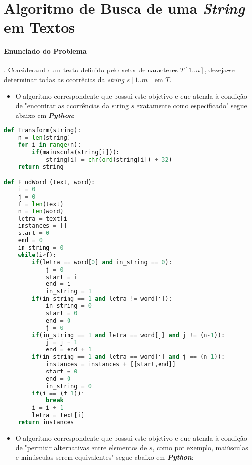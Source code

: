 \documentclass[paper=a4, fontsize=11pt]{scrartcl} %
\numberwithin{equation}{section} %
\numberwithin{figure}{section} %
\numberwithin{table}{section} %
\begin{document}
\pagebreak


\section{Algoritmo de Busca de uma \emph{String} em Textos}

\paragraph{Enunciado do Problema}: Considerando um texto definido pelo vetor de caracteres $T[1..n]$, deseja-se determinar todas as ocorrêcias da \emph{string} $s[1..m]$ em $T$. 

\begin{itemize}
   \item O algoritmo correspondente que possui este objetivo e que atenda à condição de "encontrar as ocorrências da string $s$ exatamente como especificado" segue abaixo em \emph{\textbf{Python}}:
\end{itemize}

\begin{lstlisting}[language=Python, caption=String Python Algorithm]
def Transform(string):
    n = len(string)
    for i in range(n):
        if(maiuscula(string[i])):
            string[i] = chr(ord(string[i]) + 32)
    return string

def FindWord (text, word):
    i = 0
    j = 0
    f = len(text)
    n = len(word)
    letra = text[i]
    instances = []
    start = 0
    end = 0
    in_string = 0
    while(i<f):
        if(letra == word[0] and in_string == 0):
            j = 0
            start = i
            end = i
            in_string = 1
        if(in_string == 1 and letra != word[j]):
            in_string = 0
            start = 0
            end = 0
            j = 0            
        if(in_string == 1 and letra == word[j] and j != (n-1)):
            j = j + 1
            end = end + 1   
        if(in_string == 1 and letra == word[j] and j == (n-1)):
            instances = instances + [[start,end]]
            start = 0
            end = 0
            in_string = 0
        if(i == (f-1)):
            break
        i = i + 1
        letra = text[i]
    return instances
\end{lstlisting}

\begin{itemize}
   \item O algoritmo correspondente que possui este objetivo e que atenda à condição de "permitir alternativas entre elementos de $s$, como por exemplo, maiúsculas e minúsculas serem equivalentes" segue abaixo em \emph{\textbf{Python}}:
\end{itemize}
\end{document}
